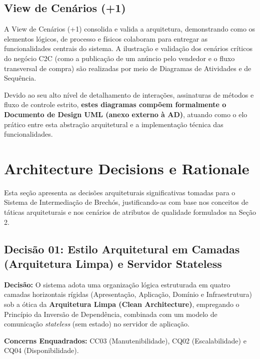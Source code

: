 ﻿\documentclass[12pt,a4paper]{article}
\begin{document}
\newpage

\subsection{View de Cenários (+1)}

A View de Cenários (+1) consolida e valida a arquitetura, demonstrando como os elementos lógicos, de processo e físicos colaboram para entregar as funcionalidades centrais do sistema. A ilustração e validação dos cenários críticos do negócio C2C (como a publicação de um anúncio pelo vendedor e o fluxo transversal de compra) são realizadas por meio de Diagramas de Atividades e de Sequência.

Devido ao seu alto nível de detalhamento de interações, assinaturas de métodos e fluxo de controle estrito, \textbf{estes diagramas compõem formalmente o Documento de Design UML (anexo externo à AD)}, atuando como o elo prático entre esta abstração arquitetural e a implementação técnica das funcionalidades.

\newpage

\section{Architecture Decisions e Rationale}

Esta seção apresenta as decisões arquiteturais significativas tomadas para o Sistema de Intermediação de Brechós, justificando-as com base nos conceitos de táticas arquiteturais e nos cenários de atributos de qualidade formulados na Seção 2.

\subsection{Decisão 01: Estilo Arquitetural em Camadas (Arquitetura Limpa) e Servidor Stateless}

\noindent\textbf{Decisão:} O sistema adota uma organização lógica estruturada em quatro camadas horizontais rígidas (Apresentação, Aplicação, Domínio e Infraestrutura) sob a ótica da \textbf{Arquitetura Limpa (Clean Architecture)}, empregando o Princípio da Inversão de Dependência, combinada com um modelo de comunicação \textit{stateless} (sem estado) no servidor de aplicação.

\vspace{0.3cm}
\noindent\textbf{Concerns Enquadrados:} CC03 (Manutenibilidade), CQ02 (Escalabilidade) e CQ04 (Disponibilidade).
\end{document}
